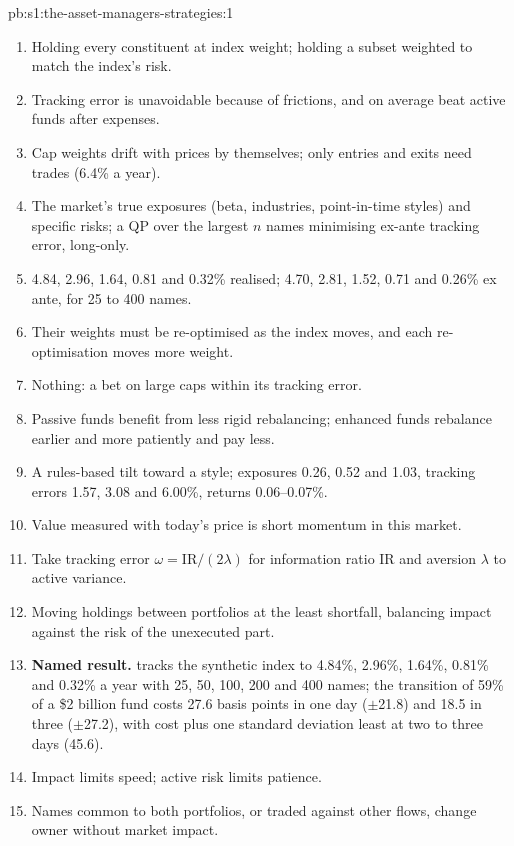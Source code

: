 \begin{solution}{pb:s1:the-asset-managers-strategies:1}
\begin{enumerate}
\item Holding every constituent at index weight; holding a subset weighted to match the index's risk.
\item Tracking error is unavoidable because of frictions, and  on average beat active funds after expenses.
\item Cap weights drift with prices by themselves; only entries and exits need trades (6.4\% a year).
\item The market's true exposures (beta, industries, point-in-time styles) and specific risks; a QP over the largest $n$ names minimising ex-ante
tracking error, long-only.
\item 4.84, 2.96, 1.64, 0.81 and 0.32\% realised; 4.70, 2.81, 1.52, 0.71 and 0.26\% ex ante, for 25 to 400 names.
\item Their weights must be re-optimised as the index moves, and each re-optimisation moves more weight.
\item Nothing: a bet on large caps within its tracking error.
\item Passive funds benefit from less rigid rebalancing; enhanced funds rebalance earlier and more patiently and pay less.
\item A rules-based tilt toward a style; exposures 0.26, 0.52 and 1.03, tracking errors 1.57, 3.08 and 6.00\%, returns 0.06--0.07\%.
\item Value measured with today's price is short momentum in this market.
\item Take tracking error $\omega = \text{IR}/(2\lambda)$ for information ratio IR and aversion $\lambda$ to active variance.
\item Moving holdings between portfolios at the least shortfall, balancing impact against the risk of the unexecuted part.
\item \textbf{Named result.}  tracks the synthetic index to 4.84\%, 2.96\%, 1.64\%, 0.81\% and 0.32\% a year with 25, 50, 100, 200 and 400
names; the transition of 59\% of a \$2 billion fund costs 27.6 basis points in one day ($\pm$21.8) and 18.5 in three ($\pm$27.2), with cost plus one
standard deviation least at two to three days (45.6).
\item Impact limits speed; active risk limits patience.
\item Names common to both portfolios, or traded against other flows, change owner without market impact.

\end{enumerate}
\end{solution}
